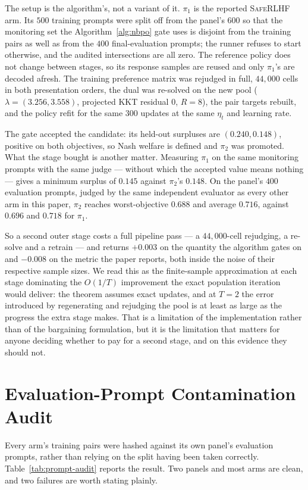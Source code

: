 \documentclass{article}
\theoremstyle{remark}
\theoremstyle{plain}
\begin{document}
The setup is the algorithm's, not a variant of it. $\pi_1$ is the reported \textsc{SafeRLHF} arm.
Its $500$ training prompts were split off from the panel's $600$ so that the monitoring set the
Algorithm~\ref{alg:nbpo} gate uses is disjoint from the training pairs as well as from the $400$
final-evaluation prompts; the runner refuses to start otherwise, and the audited intersections are
all zero. The reference policy does not change between stages, so its response samples are reused
and only $\pi_1$'s are decoded afresh. The training preference matrix was rejudged in full,
$44{,}000$ cells in both presentation orders, the dual was re-solved on the new pool
($\lambda=(3.256,3.558)$, projected KKT residual $0$, $R=8$), the pair targets rebuilt, and the
policy refit for the same $300$ updates at the same $\eta_t$ and learning rate.

The gate accepted the candidate: its held-out surpluses are $(0.240,0.148)$, positive on both
objectives, so Nash welfare is defined and $\pi_2$ was promoted. What the stage bought is another
matter. Measuring $\pi_1$ on the same monitoring prompts with the same judge --- without which the
accepted value means nothing --- gives a minimum surplus of $0.145$ against $\pi_2$'s $0.148$. On the
panel's $400$ evaluation prompts, judged by the same independent evaluator as every other arm in
this paper, $\pi_2$ reaches worst-objective $0.688$ and average $0.716$, against $0.696$ and $0.718$
for $\pi_1$.

So a second outer stage costs a full pipeline pass --- a $44{,}000$-cell rejudging, a re-solve and a
retrain --- and returns $+0.003$ on the quantity the algorithm gates on and $-0.008$ on the metric
the paper reports, both inside the noise of their respective sample sizes. We read this as the
finite-sample approximation at each stage dominating the $O(1/T)$ improvement the exact population
iteration would deliver: the theorem assumes exact updates, and at $T=2$ the error introduced by
regenerating and rejudging the pool is at least as large as the progress the extra stage makes. That
is a limitation of the implementation rather than of the bargaining formulation, but it is the
limitation that matters for anyone deciding whether to pay for a second stage, and on this evidence
they should not.

\section{Evaluation-Prompt Contamination Audit}
\label{sec:prompt-audit}
Every arm's training pairs were hashed against its own panel's evaluation prompts, rather than
relying on the split having been taken correctly. Table~\ref{tab:prompt-audit} reports the result.
Two panels and most arms are clean, and two failures are worth stating plainly.
\end{document}
